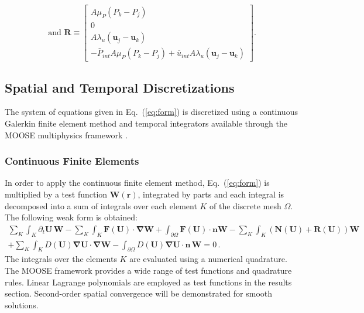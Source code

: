 \documentclass[preprint,10pt]{elsarticle}
\newcommand{\grad}{\mbold{\nabla}}
\newcommand{\mbold}[1]{\boldsymbol#1}
\newcommand{\eqt}[1]{Eq.~(\ref{#1})}                     %
\begin{document}
\begin{equation}
\text{and }
  \mathbf{R} \equiv
  \begin{bmatrix}
      A \mu_P \left( P_k - P_j \right)     \\
    0     \\
    A \lambda_u \left( \mbold u_j - \mbold u_k \right) \\
    - \bar{P}_{int} A \mu_P \left( P_k - P_j \right) + \bar{u}_{int} A \lambda_u \left( \mbold u_j - \mbold u_k \right)
  \end{bmatrix}. \nonumber
\end{equation}
%
\subsection{Spatial and Temporal Discretizations} \label{sec:disc}
The system of equations given in \eqt{eq:form} is discretized using a continuous Galerkin finite element 
method and temporal integrators available through the MOOSE multiphysics framework \cite{MOOSE}.
\subsubsection{Continuous Finite Elements} 
In order to apply the continuous finite element method, \eqt{eq:form} is multiplied by a test function 
$\mathbf W(\mbold{r})$, integrated by parts and each integral is decomposed into a sum of integrals over 
each element $K$ of the discrete mesh $\Omega$. The following weak form is obtained:
\begin{multline}\label{eq:cfem}
\sum_K \int_{K} \partial_t \mathbf U \, \mathbf W - \sum_K \int_{K} \mathbf F (\mathbf U) \cdot \grad \mathbf W + \int_{\partial \Omega} \mathbf F (\mathbf U) \cdot \mbold{n} \mathbf W - \sum_K \int_{K} \left( \mathbf N (\mathbf U) + \mathbf R (\mathbf U) \right) \mathbf W  \\
+ \sum_K \int_{K} D(\mathbf U) \grad \mathbf U \cdot \grad \mathbf W 
- \int_{\partial \Omega} D(\mathbf U) \grad \mathbf U \cdot \mbold{n} \, \mathbf W = 0 \,.
\end{multline}
The integrals over the elements $K$ are evaluated using a numerical quadrature. The MOOSE framework 
provides a wide range of test functions and quadrature rules. Linear Lagrange polynomials are employed 
as test functions in the results section. Second-order spatial convergence will be demonstrated for smooth solutions. 
\end{document}
